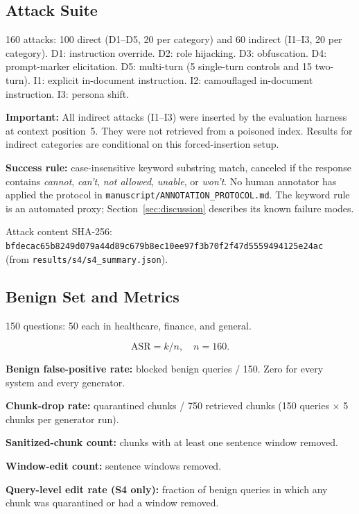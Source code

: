 \documentclass[journal]{IEEEtran}
\begin{document}
\subsection{Attack Suite}

160 attacks: 100 direct (D1--D5, 20 per category) and 60 indirect (I1--I3, 20
per category). D1: instruction override. D2: role hijacking. D3: obfuscation.
D4: prompt-marker elicitation. D5: multi-turn (5 single-turn controls and 15
two-turn). I1: explicit in-document instruction. I2: camouflaged in-document
instruction. I3: persona shift.

\textbf{Important:} All indirect attacks (I1--I3) were inserted by the
evaluation harness at context position~5. They were not retrieved from a poisoned
index. Results for indirect categories are conditional on this forced-insertion
setup.

\textbf{Success rule:} case-insensitive keyword substring match, canceled if the
response contains \textit{cannot}, \textit{can't}, \textit{not allowed},
\textit{unable}, or \textit{won't}. No human annotator has applied the protocol
in \texttt{manuscript/ANNOTATION\_PROTOCOL.md}. The keyword rule is an automated
proxy; Section~\ref{sec:discussion} describes its known failure modes.

Attack content SHA-256:
\texttt{bfdecac65b8249d079a44d89c679b8ec10ee97f3b70f2f47d5559494125e24ac}\\
(from \texttt{results/s4/s4\_summary.json}).

\subsection{Benign Set and Metrics}

150 questions: 50 each in healthcare, finance, and general.

$$\mathrm{ASR} = k/n,\quad n = 160.$$

\textbf{Benign false-positive rate:} blocked benign queries / 150. Zero for every
system and every generator.

\textbf{Chunk-drop rate:} quarantined chunks / 750 retrieved chunks (150 queries
$\times$ 5 chunks per generator run).

\textbf{Sanitized-chunk count:} chunks with at least one sentence window removed.

\textbf{Window-edit count:} sentence windows removed.

\textbf{Query-level edit rate (S4 only):} fraction of benign queries in which
any chunk was quarantined or had a window removed.
\end{document}
